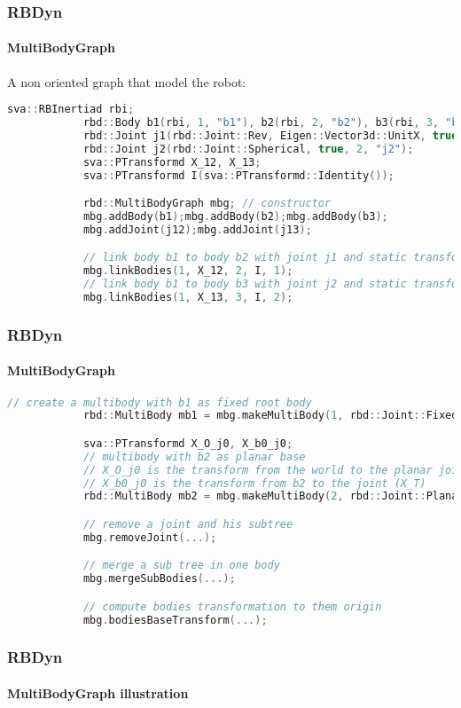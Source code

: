 \documentclass{beamer}
\begin{document}
  	\begin{frame}[fragile]
		\frametitle{RBDyn}
		\framesubtitle{MultiBodyGraph}
		A non oriented graph that model the robot:
		\begin{lstlisting}[language=C++]
			sva::RBInertiad rbi;
			rbd::Body b1(rbi, 1, "b1"), b2(rbi, 2, "b2"), b3(rbi, 3, "b3");
			rbd::Joint j1(rbd::Joint::Rev, Eigen::Vector3d::UnitX, true, 1, "j1");
			rbd::Joint j2(rbd::Joint::Spherical, true, 2, "j2");
			sva::PTransformd X_12, X_13;
			sva::PTransformd I(sva::PTransformd::Identity());

			rbd::MultiBodyGraph mbg; // constructor
			mbg.addBody(b1);mbg.addBody(b2);mbg.addBody(b3);
			mbg.addJoint(j12);mbg.addJoint(j13);

			// link body b1 to body b2 with joint j1 and static transform X_12
			mbg.linkBodies(1, X_12, 2, I, 1);
			// link body b1 to body b3 with joint j2 and static transform X_13
			mbg.linkBodies(1, X_13, 3, I, 2);
		\end{lstlisting}
	\end{frame}
  	\begin{frame}[fragile]
		\frametitle{RBDyn}
		\framesubtitle{MultiBodyGraph}
		\begin{lstlisting}[language=C++]
			// create a multibody with b1 as fixed root body
			rbd::MultiBody mb1 = mbg.makeMultiBody(1, rbd::Joint::Fixed);

			sva::PTransformd X_O_j0, X_b0_j0;
			// multibody with b2 as planar base 
			// X_O_j0 is the transform from the world to the planar joint
			// X_b0_j0 is the transform from b2 to the joint (X_T)
			rbd::MultiBody mb2 = mbg.makeMultiBody(2, rbd::Joint::Planar, X_O_j0, X_b0_j0);

			// remove a joint and his subtree
			mbg.removeJoint(...);

			// merge a sub tree in one body
			mbg.mergeSubBodies(...);

			// compute bodies transformation to them origin
			mbg.bodiesBaseTransform(...);
		\end{lstlisting}
	\end{frame}
  	\begin{frame}
		\frametitle{RBDyn}
		\framesubtitle{MultiBodyGraph illustration}
	\end{frame}
\end{document}
